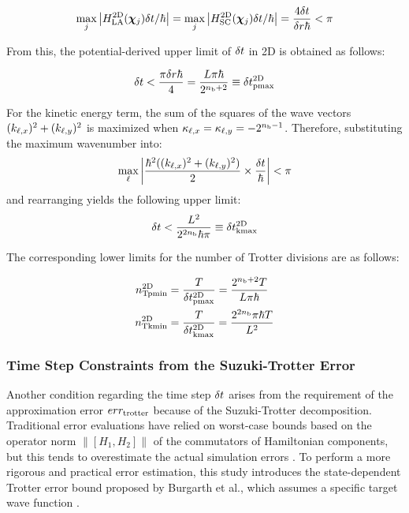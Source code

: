 \documentclass[jctc-draft.tex]{subfiles}
\begin{document}
\begin{equation}
\max_{j}{\left| H_{\mathrm{LA}}^{\mathrm{2D}}(\bm{\chi}_{j})\delta t/\hbar \right|}
  = \max_{j}{\left| H_{\mathrm{SC}}^{\mathrm{2D}}(\bm{\chi}_{j})\delta t/\hbar \right|}
  = \frac{4\delta t}{\delta r\hbar} < \pi
\end{equation}

From this, the potential-derived upper limit of $\delta t$ in 2D is obtained as
follows:

\begin{equation}
\delta t < \frac{\pi\delta r\hbar}{4}
        =\frac{L\pi\hbar}{2^{n_{\mathrm{b}}+2}}
        \equiv\delta t_{\mathrm{pmax}}^{\mathrm{2D}}
 \label{eq:nyqist-limit-by-hep-final-2D}
\end{equation}

For the kinetic energy term, the sum of the squares of the wave vectors
$(k_{\ell,x})^2+(k_{\ell,y})^2$ is maximized when $\kappa_{\ell,x}=\kappa_{\ell,y}=-2^{n_{\mathrm{b}}-1}$. Therefore,
substituting the maximum wavenumber into:
\begin{equation}
\max_{\ell}{\left| \frac{\hbar^2((k_{\ell,x})^2+(k_{\ell,y})^2)}{2}\times\frac{\delta t}{\hbar} \right|} < \pi
\end{equation}
and rearranging yields the following upper limit:
\begin{equation}
\delta t < \frac{L^2}{2^{2n_{\mathrm{b}}}\hbar\pi} \equiv\delta t_{\mathrm{kmax}}^{\mathrm{2D}}
 \label{eq:nyqist-limit-by-hek-final-2D}
\end{equation}

The corresponding lower limits for the number of Trotter divisions are as follows:

\begin{align}
    n_{\mathrm{Tpmin}}^{\mathrm{2D}} &= \frac{T}{\delta t_{\mathrm{pmax}}^{\mathrm{2D}}}=\frac{2^{n_{\mathrm{b}}+2}T}{L\pi\hbar} \\
    n_{\mathrm{Tkmin}}^{\mathrm{2D}} &= \frac{T}{\delta t_{\mathrm{kmax}}^{\mathrm{2D}}}=\frac{2^{2n_{\mathrm{b}}}\pi\hbar T}{L^2}
\end{align}

\subsubsection{Time Step Constraints from the Suzuki-Trotter Error}
\label{subsubsec:time-step-constraints-from-suzuki-trotter-error}

Another condition regarding the time step $\delta t$ arises from the requirement
of the approximation error $err_{\mathrm{trotter}}$ because of the Suzuki-Trotter
decomposition. Traditional error evaluations have relied on worst-case bounds
based on the operator norm $\| [H_1,H_2] \|$ of the commutators of Hamiltonian
components, but this tends to overestimate the actual simulation errors
\cite{Childs2021.PhysRevX.11.011020}. To perform a more rigorous and practical
error estimation, this study introduces the state-dependent Trotter error bound
proposed by Burgarth et al., which assumes a specific target wave function
\cite{Burgarth2024.PhysRevResearch.6.043155}.
\end{document}
